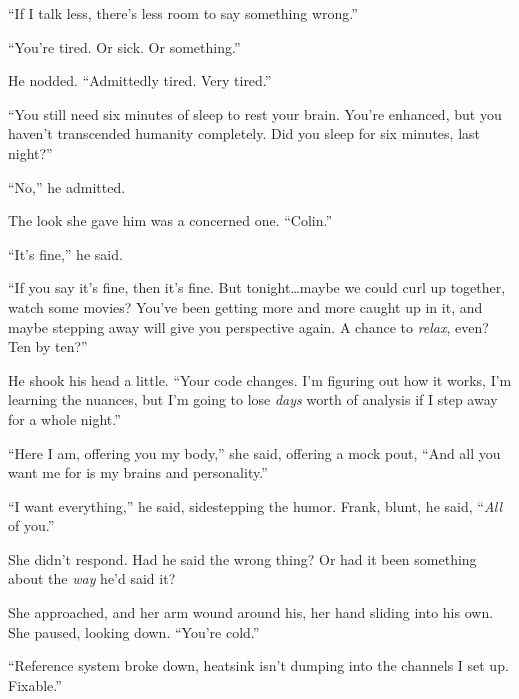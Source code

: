 ``If I talk less, there's less room to say something wrong.''



``You're tired.  Or sick.  Or something.''



He nodded.  ``Admittedly tired.  Very tired.''



``You still need six minutes of sleep to rest your brain.  You're enhanced, but you haven't transcended humanity completely.  Did you sleep for six minutes, last night?''



``No,'' he admitted.



The look she gave him was a concerned one.  ``Colin.''



``It's fine,'' he said.



``If you say it's fine, then it's fine.  But tonight\ldots maybe we could curl up together, watch some movies?  You've been getting more and more caught up in it, and maybe stepping away will give you perspective again.  A chance to \emph{relax}, even?  Ten by ten?''



He shook his head a little.  ``Your code changes.  I'm figuring out how it works, I'm learning the nuances, but I'm going to lose \emph{days} worth of analysis if I step away for a whole night.''



``Here I am, offering you my body,'' she said, offering a mock pout, ``And all you want me for is my brains and personality.''



``I want everything,'' he said, sidestepping the humor.  Frank, blunt, he said, ``\emph{All} of you.''



She didn't respond.  Had he said the wrong thing?  Or had it been something about the \emph{way} he'd said it?



She approached, and her arm wound around his, her hand sliding into his own.  She paused, looking down.  ``You're cold.''



``Reference system broke down, heatsink isn't dumping into the channels I set up.  Fixable.''



